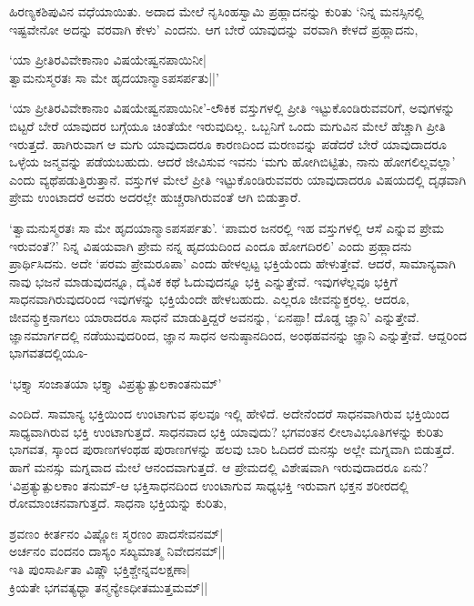 ಹಿರಣ್ಯಕಶಿಪುವಿನ ವಧೆಯಾಯಿತು. 
ಅದಾದ ಮೇಲೆ ನೃಸಿಂಹಸ್ವಾಮಿ 
ಪ್ರಹ್ಲಾದನನ್ನು ಕುರಿತು 
`ನಿನ್ನ ಮನಸ್ಸಿನಲ್ಲಿ 
ಇಷ್ಟವೇನೋ ಅದನ್ನು ವರವಾಗಿ 
ಕೇಳು' ಎಂದನು. ಆಗ ಬೇರೆ ಯಾವುದನ್ನು ವರವಾಗಿ ಕೇಳದೆ ಪ್ರಹ್ಲಾದನು,

\begin{shloka}
`ಯಾ ಪ್ರೀತಿರವಿವೇಕಾನಾಂ ವಿಷಯೇಷ್ವನಪಾಯಿನೀ|\\
ತ್ವಾಮನುಸ್ಮರತಃ ಸಾ ಮೇ ಹೃದಯಾನ್ಮಾಽಪಸರ್ಪತು||'
\end{shloka}

`ಯಾ ಪ್ರೀತಿರವಿವೇಕಾನಾಂ 
ವಿಷಯೇಷ್ವನಪಾಯಿನೀ'-ಲೌಕಿಕ 
ವಸ್ತುಗಳಲ್ಲಿ ಪ್ರೀತಿ 
ಇಟ್ಟುಕೊಂಡಿರುವವರಿಗೆ, 
ಅವುಗಳನ್ನು ಬಿಟ್ಟರೆ ಬೇರೆ 
ಯಾವುದರ ಬಗ್ಗೆಯೂ ಚಿಂತೆಯೇ 
ಇರುವುದಿಲ್ಲ. ಒಬ್ಬನಿಗೆ ಒಂದು 
ಮಗುವಿನ ಮೇಲೆ ಹೆಚ್ಚಾಗಿ 
ಪ್ರೀತಿ ಇರುತ್ತದೆ. 
ಹಾಗಿರುವಾಗ ಆ ಮಗು ಯಾವುದಾದರೂ 
ಕಾರಣದಿಂದ ಮರಣವನ್ನು ಪಡೆದರೆ 
ಬೇರೆ ಯಾವುದಾದರೂ ಒಳ್ಳೆಯ 
ಜನ್ಮವನ್ನು ಪಡೆಯಬಹುದು. ಆದರೆ 
ಜೀವಿಸುವ ಇವನು `ಮಗು 
ಹೋಗಿಬಿಟ್ಟಿತು, ನಾನು 
ಹೋಗಲಿಲ್ಲವಲ್ಲಾ' ಎಂದು 
ವ್ಯಥೆಪಡುತ್ತಿರುತ್ತಾನೆ. 
ವಸ್ತುಗಳ ಮೇಲೆ ಪ್ರೀತಿ 
ಇಟ್ಟುಕೊಂಡಿರುವವರು 
ಯಾವುದಾದರೂ ವಿಷಯದಲ್ಲಿ 
ದೃಢವಾಗಿ ಪ್ರೇಮ ಉಂಟಾದರೆ ಅವರು ಅದರಲ್ಲೇ ಹುಚ್ಚರಾಗಿರುವಂತೆ ಆಗಿ ಬಿಡುತ್ತಾರೆ.

`ತ್ವಾಮನುಸ್ಮರತಃ ಸಾ ಮೇ 
ಹೃದಯಾನ್ಮಾಽಪಸರ್ಪತು'. `ಪಾಮರ 
ಜನರಲ್ಲಿ ಇಹ ವಸ್ತುಗಳಲ್ಲಿ 
ಆಸೆ ಎನ್ನುವ ಪ್ರೇಮ ಇರುವಂತೆ?' 
ನಿನ್ನ ವಿಷಯವಾಗಿ ಪ್ರೇಮ ನನ್ನ 
ಹೃದಯದಿಂದ ಎಂದೂ ಹೋಗದಿರಲಿ' 
ಎಂದು ಪ್ರಹ್ಲಾದನು 
ಪ್ರಾರ್ಥಿಸಿದನು. ಅದೇ `ಪರಮ 
ಪ್ರೇಮರೂಪಾ' ಎಂದು ಹೇಳಲ್ಪಟ್ಟ 
ಭಕ್ತಿಯೆಂದು ಹೇಳುತ್ತೇವೆ. 
ಆದರೆ, ಸಾಮಾನ್ಯವಾಗಿ ನಾವು 
ಭಜನೆ ಮಾಡುವುದನ್ನೂ, ದೈವಿಕ 
ಕಥೆ ಓದುವುದನ್ನೂ ಭಕ್ತಿ 
ಎನ್ನುತ್ತೇವೆ. ಇವುಗಳೆಲ್ಲವೂ 
ಭಕ್ತಿಗೆ 
ಸಾಧನವಾಗಿರುವುದರಿಂದ 
ಇವುಗಳನ್ನು ಭಕ್ತಿಯೆಂದೇ 
ಹೇಳಬಹುದು. ಎಲ್ಲರೂ 
ಜೀವನ್ಮುಕ್ತರಲ್ಲ. ಆದರೂ, 
ಜೀವನ್ಮುಕ್ತನಾಗಲು ಯಾರಾದರೂ 
ಸಾಧನೆ ಮಾಡುತ್ತಿದ್ದರೆ 
ಅವನನ್ನು, `ಏನಪ್ಪಾ! ದೊಡ್ಡ 
ಜ್ಞಾನಿ' ಎನ್ನುತ್ತೇವೆ. 
ಜ್ಞಾನಮಾರ್ಗದಲ್ಲಿ 
ನಡೆಯುವುದರಿಂದ, ಜ್ಞಾನ ಸಾಧನ 
ಅನುಷ್ಠಾನದಿಂದ, ಅಂಥಹವನನ್ನು 
ಜ್ಞಾನಿ ಎನ್ನುತ್ತೇವೆ. ಆದ್ದರಿಂದ ಭಾಗವತದಲ್ಲಿಯೂ-

\begin{shloka}
`ಭಕ್ತ್ಯಾ ಸಂಜಾತಯಾ ಭಕ್ತ್ಯಾ ವಿಪ್ರತ್ಯುತ್ಪುಲಕಾಂತನುಮ್'
\end{shloka}

ಎಂದಿದೆ. ಸಾಮಾನ್ಯ ಭಕ್ತಿಯಿಂದ 
ಉಂಟಾಗುವ ಫಲವೂ ಇಲ್ಲಿ ಹೇಳಿದೆ. 
ಅದೇನೆಂದರೆ ಸಾಧನವಾಗಿರುವ 
ಭಕ್ತಿಯಿಂದ ಸಾಧ್ಯವಾಗಿರುವ 
ಭಕ್ತಿ ಉಂಟಾಗುತ್ತದೆ. 
ಸಾಧನವಾದ ಭಕ್ತಿ ಯಾವುದು? 
ಭಗವಂತನ ಲೀಲಾವಿಭೂತಿಗಳನ್ನು 
ಕುರಿತು ಭಾಗವತ, ಸ್ಕಾಂದ 
ಪುರಾಣಗಳಂಥಹ ಪುರಾಣಗಳನ್ನು 
ಹಲವು ಬಾರಿ ಓದಿದರೆ ಮನಸ್ಸು 
ಅಲ್ಲೇ ಮಗ್ನವಾಗಿ ಬಿಡುತ್ತದೆ. 
ಹಾಗೆ ಮನಸ್ಸು ಮಗ್ನವಾದ ಮೇಲೆ 
ಆನಂದವಾಗುತ್ತದೆ. ಆ 
ಪ್ರೇಮದಲ್ಲಿ ವಿಶೇಷವಾಗಿ 
ಇರುವುದಾದರೂ ಏನು? 
`ವಿಪ್ರತ್ಯುತ್ಪುಲಕಾಂ 
ತನುಮ್-ಆ ಭಕ್ತಿಸಾಧನದಿಂದ 
ಉಂಟಾಗುವ ಸಾಧ್ಯಭಕ್ತಿ ಇರುವಾಗ 
ಭಕ್ತನ ಶರೀರದಲ್ಲಿ ರೋಮಾಂಚನವಾಗುತ್ತದೆ. ಸಾಧನಾ ಭಕ್ತಿಯನ್ನು ಕುರಿತು,

\begin{shloka}
ಶ್ರವಣಂ ಕೀರ್ತನಂ ವಿಷ್ಣೋಃ ಸ್ಮರಣಂ ಪಾದಸೇವನಮ್|\\
ಅರ್ಚನಂ ವಂದನಂ ದಾಸ್ಯಂ ಸಖ್ಯಮಾತ್ಮ ನಿವೇದನಮ್||\\
ಇತಿ ಪುಂಸಾರ್ಪಿತಾ ವಿಷ್ಣೌ ಭಕ್ತಿಶ್ಚೇನ್ನವಲಕ್ಷಣಾ|\\
ಕ್ರಿಯತೇ ಭಗವತ್ಯಧ್ಧಾ ತನ್ಮನ್ಯೇಽಧೀತಮುತ್ತಮಮ್||
\end{shloka}

